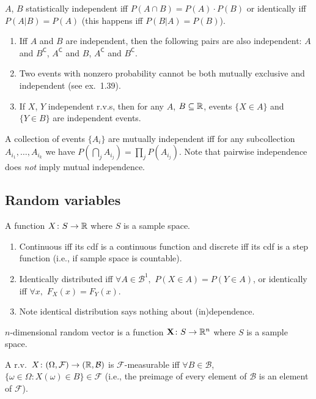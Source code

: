 \documentclass[8pt,letterpaper, landscape]{extarticle} %
\newcommand{\B}{\ensuremath{\mathcal{B}}}
\newcommand{\mX}{\ensuremath{\mathbf{X}}}
\begin{document}
\begin{multicols}{3}
\begin{description}
 $ A $, $ B $ statistically independent iff $ P(A \cap B) = P(A) \cdot P(B) $ or identically iff $ P(A|B) = P(A) $ (this happens iff $ P(B|A) = P(B) $).
\begin{enumerate}
\item Iff $ A $ and $ B $ are independent, then the following pairs are also independent: $ A $ and $ B^{\mathsf{C}} $, $ A^{\mathsf{C}} $ and $ B $, $ A^{\mathsf{C}} $ and $ B^{\mathsf{C}} $.
\item Two events with nonzero probability cannot be both mutually exclusive and independent (see ex.~1.39).
\item If $ X $, $ Y $ independent r.v.s, then for any $ A $, $ B \subseteq \mathbb{R} $, events $ \{ X \in A \} $ and $ \{ Y \in B \} $ are independent events.
\end{enumerate}

 A collection of events $ \{ A_i \} $ are mutually independent iff for any subcollection $ A_{i_1}, \dotsc, A_{i_k} $ we have $ P (\bigcap_j A_{i_j}) = \prod_j P(A_{i_j}) $. Note that pairwise independence does \textit{not} imply mutual independence.

\subsection{Random variables}
 A function $ X \colon S \to \mathbb{R} $ where $ S $ is a sample space.
\begin{enumerate}
\item Continuous iff its cdf is a continuous function and discrete iff its cdf is a step function (i.e., if sample space is countable).
\item Identically distributed iff $ \forall A \in \B^1, $ $ P(X \in A) = P (Y \in A) $, or identically iff $ \forall x, $ $ F_X(x) = F_Y(x) $.
\item Note identical distribution says nothing about (in)dependence.
\end{enumerate}

 $ n $-dimensional random vector is a function $ \mX \colon S \to \R^n $ where $ S $ is a sample space.

 A r.v.\ $ X \colon (\Omega, \mathcal{F}) \to (\mathbb{R}, \mathcal{B}) $ is $ \mathcal{F} $-measurable iff $ \forall B \in \mathcal{B} $, $ \{ \omega \in \Omega \colon X(\omega) \in B \} \in \mathcal{F} $ (i.e., the preimage of every element of $ \mathcal{B} $ is an element of $ \mathcal{F} $).


\end{description}
\end{multicols}
\end{document}
